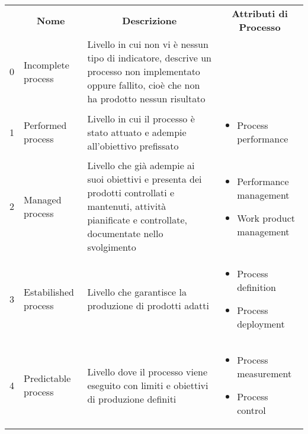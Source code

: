     \begin{table}[H]
        \centering
                        
        \renewcommand{\arraystretch}{2.6}
        \begin{tabular}{p{1.1cm} p{2cm} p{6.9cm} p{5.2cm}}
            \rowcolor[HTML]{232f3e} 
            \multicolumn{1}{c}{\color[HTML]{FFFFFF} \textbf{Livello}} &
            \multicolumn{1}{c}{\color[HTML]{FFFFFF} \textbf{Nome}} &
            \multicolumn{1}{c}{\color[HTML]{FFFFFF} \textbf{Descrizione}} &
            \multicolumn{1}{c}{\color[HTML]{FFFFFF} \textbf{Attributi di Processo}} \\
            
        0 & Incomplete process &  Livello in cui non vi è nessun tipo di indicatore, descrive un processo non implementato oppure fallito, cioè che non ha prodotto nessun risultato & \\
        1 & Performed process &  Livello in cui il processo è stato attuato e adempie all'obiettivo prefissato & 
        \begin{itemize}
            \item Process performance
        \end{itemize} \\
        2 & Managed process &  Livello che già adempie ai suoi obiettivi e presenta dei prodotti controllati e mantenuti, attività pianificate e controllate, documentate nello svolgimento & 
        \begin{itemize}
            \item Performance management
            \item Work product management
        \end{itemize}\\
        3 & Estabilished process & Livello che garantisce la produzione di prodotti adatti & 
        \begin{itemize}
            \item Process definition
            \item Process deployment
        \end{itemize} \\
        4 & Predictable process &  Livello dove il processo viene eseguito con limiti e obiettivi di produzione definiti & 
        \begin{itemize}
            \item Process measurement
            \item Process control

\end{itemize}
\end{tabular}
\end{table}
